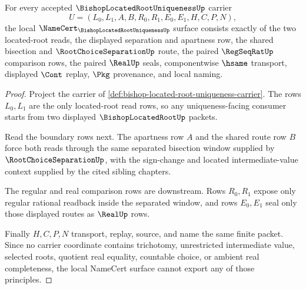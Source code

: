 \begin{theorem}
\label{thm:bishop-located-root-uniqueness-namecert-obligations}
For every accepted $\BishopLocatedRootUniquenessUp$ carrier
$$
U=(L_0,L_1,A,B,R_0,R_1,E_0,E_1,H,C,P,N),
$$
the local $\NameCert_{\BishopLocatedRootUniquenessUp}$ surface consists exactly of the two located-root reads, the displayed separation and apartness row, the shared bisection and $\RootChoiceSeparationUp$ route, the paired $\RegSeqRatUp$ comparison rows, the paired $\RealUp$ seals, componentwise $\hsame$ transport, displayed $\Cont$ replay, $\Pkg$ provenance, and local naming.
\end{theorem}
\begin{proof}
Project the carrier of \autoref{def:bishop-located-root-uniqueness-carrier}. The rows $L_0,L_1$ are the only located-root read rows, so any uniqueness-facing consumer starts from two displayed $\BishopLocatedRootUp$ packets.

Read the boundary rows next. The apartness row $A$ and the shared route row $B$ force both reads through the same separated bisection window supplied by $\RootChoiceSeparationUp$, with the sign-change and located intermediate-value context supplied by the cited sibling chapters.

The regular and real comparison rows are downstream. Rows $R_0,R_1$ expose only regular rational readback inside the separated window, and rows $E_0,E_1$ seal only those displayed routes as $\RealUp$ rows.

Finally $H,C,P,N$ transport, replay, source, and name the same finite packet. Since no carrier coordinate contains trichotomy, unrestricted intermediate value, selected roots, quotient real equality, countable choice, or ambient real completeness, the local NameCert surface cannot export any of those principles.
\end{proof}

